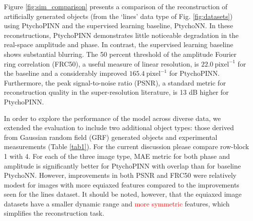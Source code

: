 \documentclass[sn-mathphys]{sn-jnl}%
\theoremstyle{thmstyleone}%
\theoremstyle{thmstyletwo}%
\theoremstyle{thmstylethree}%
\begin{document}
Figure \ref{fig:sim_comparison} presents a comparison of the reconstruction of artificially generated objects (from the `lines' data type of Fig. \ref{fig:datasets}) using PtychoPINN and the supervised learning baseline, PtychoNN. In these reconstructions, PtychoPINN demonstrates little noticeable degradation in the real-space amplitude and phase. In contrast, the supervised learning baseline shows substantial blurring. The 50 percent threshold of the amplitude Fourier ring correlation (FRC50), a useful measure of linear resolution, is $22.0~\mathrm{pixel}^{-1}$ for the baseline and a considerably improved $165.4~\mathrm{pixel}^{-1}$ for PtychoPINN. Furthermore, the peak signal-to-noise ratio (PSNR), a standard metric for reconstruction quality in the super-resolution literature, is 13 dB higher for PtychoPINN. 

In order to explore the performance of the model across diverse data, we extended the evaluation to include two additional object types: those derived from Gaussian random field (GRF) generated objects and experimental measurements (Table \ref{tab1}).  For the current discussion please compare row-block 1 with 4. For each of the three image type, MAE metric for both phase and amplitude is significantly better for PtychoPINN with overlap than for baseline PtychoNN.  However, improvements in both PSNR and FRC50 were relatively modest for images with more equiaxed features compared to the improvements seen for the lines dataset. It should be noted, however, that the equiaxed image datasets have a smaller dynamic range and \textcolor{red}{more symmetric} features, which simplifies the reconstruction task.
\end{document}
